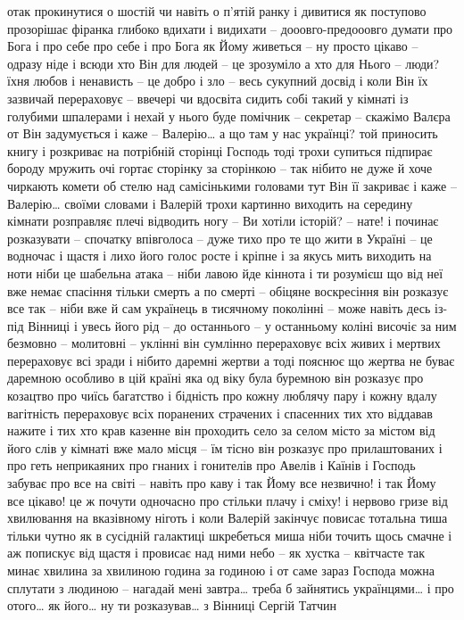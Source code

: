 отак прокинутися о шостій чи навіть о п'ятій ранку
і дивитися як поступово прозорішає фіранка
глибоко вдихати і видихати – дооовго-предооовго
думати про Бога і про себе про себе і про Бога
як Йому живеться – ну просто цікаво – одразу ніде і всюди
хто Він для людей – це зрозуміло а хто для Нього – люди?
їхня любов і ненависть – це добро і зло – весь сукупний досвід
і коли Він їх зазвичай перераховує – ввечері чи вдосвіта
сидить собі такий у кімнаті із голубими шпалерами
і нехай у нього буде помічник – секретар – скажімо Валєра
от Він задумується і каже – Валерію… а що там у нас українці?
той приносить книгу і розкриває на потрібній сторінці
Господь тоді трохи супиться підпирає бороду мружить очі
гортає сторінку за сторінкою – так нібито не дуже й хоче
чиркають комети об стелю над самісінькими головами
тут Він її закриває і каже – Валерію… своїми словами
і Валерій трохи картинно виходить на середину кімнати
розправляє плечі відводить ногу – Ви хотіли історій? – нате!
і починає розказувати – спочатку впівголоса – дуже тихо
про те що жити в Україні – це водночас і щастя і лихо
його голос росте і кріпне і за якусь мить виходить на ноти
ніби це шабельна атака – ніби лавою йде кіннота
і ти розумієш що від неї вже немає спасіння
тільки смерть а по смерті – обіцяне воскресіння
він розказує все так – ніби вже й сам українець
в тисячному поколінні – може навіть десь із-під Вінниці
і увесь його рід – до останнього – у останньому коліні
височіє за ним безмовно – молитовні – уклінні
він сумлінно перераховує всіх живих і мертвих
перераховує всі зради і нібито даремні жертви
а тоді пояснює що жертва не буває даремною
особливо в цій країні яка од віку була буремною
він розказує про козацтво про чиїсь багатство і бідність
про кожну люблячу пару і кожну вдалу вагітність
перераховує всіх поранених страчених і спасенних
тих хто віддавав нажите і тих хто крав казенне
він проходить село за селом місто за містом
від його слів у кімнаті вже мало місця – їм тісно
він розказує про прилаштованих і про геть неприкаяних
про гнаних і гонителів про Авелів і Каїнів
і Господь забуває про все на світі – навіть про каву
і так Йому все незвично! і так Йому все цікаво!
це ж почути одночасно про стільки плачу і сміху!
і нервово гризе від хвилювання на вказівному ніготь
і коли Валерій закінчує повисає тотальна тиша
тільки чутно як в сусідній галактиці шкребеться миша
ніби точить щось смачне і аж попискує від щастя
і провисає над ними небо – як хустка – квітчасте
так минає хвилина за хвилиною година за годиною
і от саме зараз Господа можна сплутати з людиною
– нагадай мені завтра… треба б зайнятись українцями…
і про отого… як його… ну ти розказував… з Вінниці
Сергій Татчин
